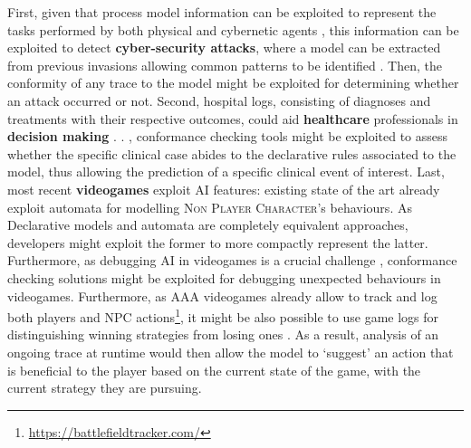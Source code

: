  First, given that process model information can be exploited to represent the tasks performed by both physical and cybernetic agents \cite{Ioanna}, this information can be exploited to detect \textbf{cyber-security attacks}, where a model can be extracted from previous invasions allowing common patterns to be identified \cite{BENASHER201551,LagraaS20}. Then, the conformity of any trace to the model might be exploited for determining whether an attack occurred or not. Second,  hospital logs, consisting of diagnoses and treatments with their respective outcomes, could aid \textbf{healthcare} professionals in  \textbf{decision making} \cite{Amantea2020}.  \cite{mining,KusumaKMHGJ20}. , conformance checking tools might be exploited to assess whether the specific clinical case abides to the declarative rules associated to the model, thus allowing the prediction of a specific clinical event of interest. Last, most recent \textbf{videogames}  exploit AI features: existing state of the art already exploit automata \cite{Miyake2017} for modelling \textsc{Non Player Character}'s behaviours. As Declarative models and automata are completely equivalent approaches, developers might exploit the former to more compactly represent the latter. Furthermore, as debugging AI in videogames is a crucial challenge \cite{john2019debugging}, conformance checking solutions might be exploited for debugging unexpected behaviours in videogames. Furthermore, as AAA videogames already allow to track and log both players and NPC actions\footnote{\url{https://battlefieldtracker.com/}}, it might be also possible to use game logs for distinguishing winning strategies from losing ones \cite{mining}. As a result, analysis of an ongoing trace at runtime would then allow the model to `suggest' an action that is beneficial to the player based on the current state of the game, with the current strategy they are pursuing.


